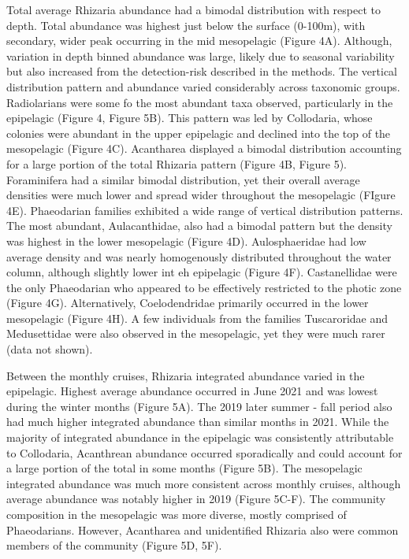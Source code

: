 \documentclass[
]{article}
\begin{document}
Total average Rhizaria abundance had a bimodal distribution with respect
to depth. Total abundance was highest just below the surface (0-100m),
with secondary, wider peak occurring in the mid mesopelagic (Figure 4A).
Although, variation in depth binned abundance was large, likely due to
seasonal variability but also increased from the detection-risk
described in the methods. The vertical distribution pattern and
abundance varied considerably across taxonomic groups. Radiolarians were
some fo the most abundant taxa observed, particularly in the epipelagic
(Figure 4, Figure 5B). This pattern was led by Collodaria, whose
colonies were abundant in the upper epipelagic and declined into the top
of the mesopelagic (Figure 4C). Acantharea displayed a bimodal
distribution accounting for a large portion of the total Rhizaria
pattern (Figure 4B, Figure 5). Foraminifera had a similar bimodal
distribution, yet their overall average densities were much lower and
spread wider throughout the mesopelagic (FIgure 4E). Phaeodarian
families exhibited a wide range of vertical distribution patterns. The
most abundant, Aulacanthidae, also had a bimodal pattern but the density
was highest in the lower mesopelagic (Figure 4D). Aulosphaeridae had low
average density and was nearly homogenously distributed throughout the
water column, although slightly lower int eh epipelagic (Figure 4F).
Castanellidae were the only Phaeodarian who appeared to be effectively
restricted to the photic zone (Figure 4G). Alternatively, Coelodendridae
primarily occurred in the lower mesopelagic (Figure 4H). A few
individuals from the families Tuscaroridae and Medusettidae were also
observed in the mesopelagic, yet they were much rarer (data not shown).

Between the monthly cruises, Rhizaria integrated abundance varied in the
epipelagic. Highest average abundance occurred in June 2021 and was
lowest during the winter months (Figure 5A). The 2019 later summer -
fall period also had much higher integrated abundance than similar
months in 2021. While the majority of integrated abundance in the
epipelagic was consistently attributable to Collodaria, Acanthrean
abundance occurred sporadically and could account for a large portion of
the total in some months (Figure 5B). The mesopelagic integrated
abundance was much more consistent across monthly cruises, although
average abundance was notably higher in 2019 (Figure 5C-F). The
community composition in the mesopelagic was more diverse, mostly
comprised of Phaeodarians. However, Acantharea and unidentified Rhizaria
also were common members of the community (Figure 5D, 5F).
\end{document}
